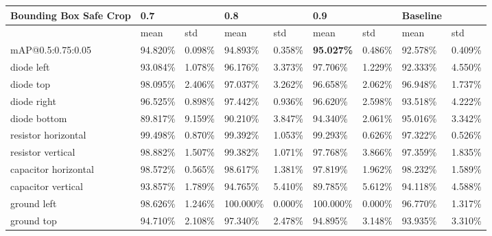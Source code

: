 
\begin{table}[H]
\scriptsize %
\begin{center}
\begin{tabular}{|l|l|l|l|l|l|l|l|l|}
\hline
Bounding Box Safe Crop          & 0.7      &          & 0.8      &          & 0.9      &          & Baseline &              \\
\hline
                                & mean     & std      & mean     & std      & mean     & std      & mean     & std          \\
\hline
mAP@0.5:0.75:0.05               & 94.820\%  & 0.098\% & 94.893\%  & 0.358\% & \textbf{95.027\%}  & 0.486\%  & 92.578\%  & 0.409\%   \\
\hline
\rowcolor{lightgray!50}
diode left                      & 93.084\%  & 1.078\% & 96.176\%  & 3.373\% & 97.706\%  & 1.229\%  & 92.333\%  & 4.550\%   \\
diode top                       & 98.095\%  & 2.406\% & 97.037\%  & 3.262\% & 96.658\%  & 2.062\%  & 96.948\%  & 1.737\%   \\
\rowcolor{lightgray!50}
diode right                     & 96.525\%  & 0.898\% & 97.442\%  & 0.936\% & 96.620\%  & 2.598\%  & 93.518\%  & 4.222\%   \\
diode bottom                    & 89.817\%  & 9.159\% & 90.210\%  & 3.847\% & 94.340\%  & 2.061\%  & 95.016\%  & 3.342\%   \\
\rowcolor{lightgray!50}
resistor horizontal             & 99.498\%  & 0.870\% & 99.392\%  & 1.053\% & 99.293\%  & 0.626\%  & 97.322\%  & 0.526\%   \\
resistor vertical               & 98.882\%  & 1.507\% & 99.382\%  & 1.071\% & 97.768\%  & 3.866\%  & 97.359\%  & 1.835\%   \\
\rowcolor{lightgray!50}
capacitor horizontal            & 98.572\%  & 0.565\% & 98.617\%  & 1.381\% & 97.819\%  & 1.962\%  & 98.232\%  & 1.589\%   \\
capacitor vertical              & 93.857\%  & 1.789\% & 94.765\%  & 5.410\% & 89.785\%  & 5.612\%  & 94.118\%  & 4.588\%   \\
\rowcolor{lightgray!50}
ground left                     & 98.626\%  & 1.246\% & 100.000\% & 0.000\% & 100.000\% & 0.000\%  & 96.770\%  & 1.317\%   \\
ground top                      & 94.710\%  & 2.108\% & 97.340\%  & 2.478\% & 94.895\%  & 3.148\%  & 93.935\%  & 3.310\%   \\

\end{tabular}
\end{center}
\end{table}
